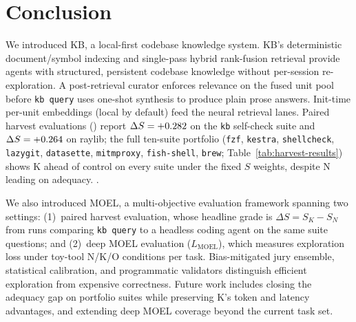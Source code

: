 \section{Conclusion}
\label{sec:conclusion}

We introduced KB, a local-first codebase knowledge system.
KB's deterministic document/symbol indexing and single-pass hybrid rank-fusion
retrieval provide agents with structured, persistent codebase knowledge without
per-session re-exploration.  A post-retrieval curator enforces relevance on the
fused unit pool before \texttt{kb query} uses one-shot synthesis to produce plain
prose answers.  Init-time per-unit embeddings (local by default) feed the neural
retrieval lanes.
Paired harvest evaluations
(\ResultsUpdated{}) report $\Delta S = +0.282{}$ on the \texttt{kb} self-check
suite and $\Delta S = +0.264{}$ on raylib; the full ten-suite portfolio
(\texttt{fzf}, \texttt{kestra}, \texttt{shellcheck}, \texttt{lazygit},
\texttt{datasette}, \texttt{mitmproxy}, \texttt{fish-shell}, \texttt{brew};
Table~\ref{tab:harvest-results}) shows K ahead of control on every suite under
the fixed $S$ weights, despite N leading on adequacy.
\ResultsControlStatus{}.

We also introduced MOEL, a multi-objective evaluation framework spanning two settings:
(1)~paired harvest evaluation, whose headline grade is $\Delta S = S_K - S_N$ from
runs comparing \texttt{kb query} to a headless coding agent on the same suite questions;
and (2)~deep MOEL evaluation ($L_\text{MOEL}$), which measures exploration loss under
toy-tool N/K/O conditions per task.  Bias-mitigated jury ensemble, statistical calibration,
and programmatic validators distinguish efficient exploration from expensive correctness.
Future work includes closing the adequacy gap on portfolio suites while preserving
K's token and latency advantages, and extending deep MOEL coverage beyond the
current task set.
